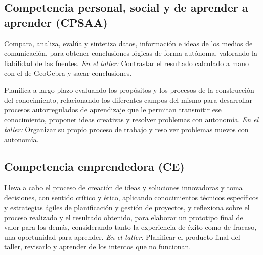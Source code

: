 \documentclass[11pt,a4paper]{article}
\begin{document}
\subsection*{Competencia personal, social y de aprender a aprender (CPSAA)}
\begin{description}[leftmargin=0pt, style=nextline]
  \item[\color{acento}CPSAA4] Compara, analiza, evalúa y sintetiza datos, información e ideas de los medios de comunicación, para obtener conclusiones lógicas de forma autónoma, valorando la fiabilidad de las fuentes.\newline
    {\color{gris}\textit{En el taller:} Contrastar el resultado calculado a mano con el de GeoGebra y sacar conclusiones.}
  \item[\color{acento}CPSAA5] Planifica a largo plazo evaluando los propósitos y los procesos de la construcción del conocimiento, relacionando los diferentes campos del mismo para desarrollar procesos autorregulados de aprendizaje que le permitan transmitir ese conocimiento, proponer ideas creativas y resolver problemas con autonomía.\newline
    {\color{gris}\textit{En el taller:} Organizar su propio proceso de trabajo y resolver problemas nuevos con autonomía.}
\end{description}

\subsection*{Competencia emprendedora (CE)}
\begin{description}[leftmargin=0pt, style=nextline]
  \item[\color{acento}CE3] Lleva a cabo el proceso de creación de ideas y soluciones innovadoras y toma decisiones, con sentido crítico y ético, aplicando conocimientos técnicos específicos y estrategias ágiles de planificación y gestión de proyectos, y reflexiona sobre el proceso realizado y el resultado obtenido, para elaborar un prototipo final de valor para los demás, considerando tanto la experiencia de éxito como de fracaso, una oportunidad para aprender.\newline
    {\color{gris}\textit{En el taller:} Planificar el producto final del taller, revisarlo y aprender de los intentos que no funcionan.}
\end{description}
\end{document}
